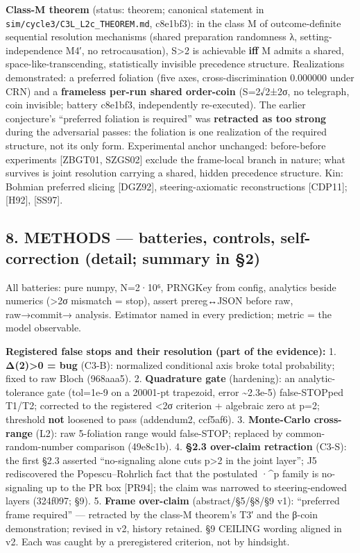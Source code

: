 \documentclass[
  11pt]{article}
\begin{document}
\textbf{Class-M theorem} (status: theorem; canonical statement in
\texttt{sim/cycle3/C3L\_L2c\_THEOREM.md}, c8e1bf3): in the class M of
outcome-definite sequential resolution mechanisms (shared preparation
randomness λ, setting-independence M4′, no retrocausation),
S\textgreater2 is achievable \textbf{iff} M admits a shared,
space-like-transcending, statistically invisible precedence structure.
Realizations demonstrated: a preferred foliation (five axes,
cross-discrimination 0.000000 under CRN) and a \textbf{frameless per-run
shared order-coin} (S=2√2±2σ, no telegraph, coin invisible; battery
c8e1bf3, independently re-executed). The earlier conjecture's
``preferred foliation is required'' was \textbf{retracted as too strong}
during the adversarial passes: the foliation is one realization of the
required structure, not its only form. Experimental anchor unchanged:
before-before experiments {[}ZBGT01, SZGS02{]} exclude the frame-local
branch in nature; what survives is joint resolution carrying a shared,
hidden precedence structure. Kin: Bohmian preferred slicing {[}DGZ92{]},
steering-axiomatic reconstructions {[}CDP11{]}; {[}H92{]}, {[}SS97{]}.

\subsection{8. METHODS --- batteries, controls, self-correction (detail;
summary in
§2)}\label{methods-batteries-controls-self-correction-detail-summary-in-2}

All batteries: pure numpy, N=2·10⁶, PRNGKey from config, analytics
beside numerics (\textgreater2σ mismatch = stop), assert prereg↔JSON
before raw, raw→commit→ analysis. Estimator named in every prediction;
metric = the model observable.

\textbf{Registered false stops and their resolution (part of the
evidence):} 1. \textbf{Δ(2)\textgreater0 = bug} (C3-B): normalized
conditional axis broke total probability; fixed to raw Bloch (968aaa5).
2. \textbf{Quadrature gate} (hardening): an analytic-tolerance gate
(tol=1e-9 on a 20001-pt trapezoid, error \textasciitilde2.3e-5)
false-STOPped T1/T2; corrected to the registered \textless2σ criterion +
algebraic zero at p=2; threshold \textbf{not} loosened to pass
(addendum2, ccf5af6). 3. \textbf{Monte-Carlo cross-range} (L2): raw
5-foliation range would false-STOP; replaced by common-random-number
comparison (49e8c1b). 4. \textbf{§2.3 over-claim retraction} (C3-S): the
first §2.3 asserted ``no-signaling alone cuts p\textgreater2 in the
joint layer''; J5 rediscovered the Popescu--Rohrlich fact that the
postulated \textbar·\textbar\^{}p family is no-signaling up to the PR
box {[}PR94{]}; the claim was narrowed to steering-endowed layers
(324f097; §9). 5. \textbf{Frame over-claim} (abstract/§5/§8/§9 v1):
``preferred frame required'' --- retracted by the class-M theorem's T3′
and the β-coin demonstration; revised in v2, history retained. §9
CEILING wording aligned in v2. Each was caught by a preregistered
criterion, not by hindsight.
\end{document}
